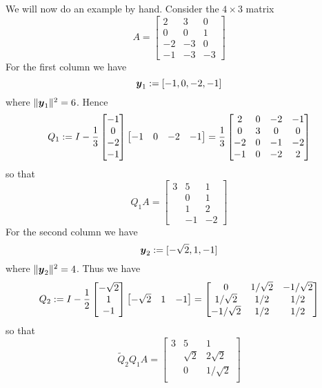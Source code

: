 \begin{example} We will now do an example by hand. Consider the $4 \ensuremath{\times} 3$ matrix
\[
A = \begin{bmatrix} 
2 & 3 & 0 \\ 
0 & 0 & 1 \\
-2 & -3 & 0 \\
-1 & -3 & -3
\end{bmatrix}
\]
For the first column we have
\[
\bm{{\mbox{\boldmath$y$\unboldmath}}}_1 := [-1,0,-2,-1]
\]
where $\| \bm{{\mbox{\boldmath$y$\unboldmath}}}_1 \|^2 = 6$. Hence
\[
Q_1 := I - {1 \over 3} \begin{bmatrix} -1 \\ 0 \\ -2 \\ -1 \end{bmatrix} \begin{bmatrix} -1 & 0 & -2 & -1 \end{bmatrix} =
 {1 \over 3} \begin{bmatrix}
2 & 0 & -2 & -1 \\
0 & 3 & 0 & 0 \\
-2 & 0 & -1 & -2 \\
-1 & 0 & -2 &  2
\end{bmatrix}
\]
so that
\[
Q_1 A = \begin{bmatrix} 3 &  5 & 1 \\
 & 0 & 1 \\
  & 1 & 2 \\
& -1 & -2
\end{bmatrix}
\]
For the second column we have
\[
\bm{{\mbox{\boldmath$y$\unboldmath}}}_2 :=  [-\sqrt{2},1,-1]
\]
where $\| \bm{{\mbox{\boldmath$y$\unboldmath}}}_2 \|^2 = 4$. Thus we have
\[
Q_2 := I - {1 \over 2}
 \begin{bmatrix} -\sqrt{2} \\1 \\ -1
\end{bmatrix} \begin{bmatrix} -\sqrt{2} & 1 & -1 \end{bmatrix}
= \begin{bmatrix}
0 & 1/\sqrt{2} & -1/\sqrt{2} \\
1/\sqrt{2} & 1/2 & 1/2 \\
-1/\sqrt{2} & 1/2 & 1/2
\end{bmatrix}
\]
so that
\[
\tilde Q_2 Q_1 A = \begin{bmatrix} 3 & 5 & 1 \\
 & \sqrt{2} & 2\sqrt{2} \\
  & 0 & 1/\sqrt{2} \\

\end{bmatrix}\]
\end{example}
